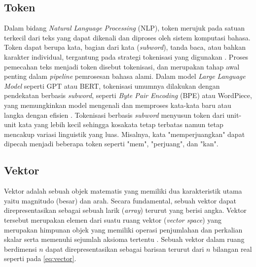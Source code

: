 \subsection{Token}
Dalam bidang \textit{Natural Language Processing} (NLP), token merujuk pada satuan terkecil dari teks yang dapat dikenali dan diproses oleh sistem komputasi bahasa.
Token dapat berupa kata, bagian dari kata (\textit{subword}), tanda baca, atau bahkan karakter individual, tergantung pada strategi tokenisasi yang digunakan \cite{Jurafsky2023SpeechLangageProcessing}.
Proses pemecahan teks menjadi token disebut tokenisasi, dan merupakan tahap awal penting dalam \textit{pipeline} pemrosesan bahasa alami.
Dalam model \textit{Large Language Model} seperti GPT atau BERT, tokenisasi umumnya dilakukan dengan pendekatan berbasis \textit{subword}, seperti \textit{Byte Pair Encoding} (BPE) atau WordPiece, yang memungkinkan model mengenali dan memproses kata-kata baru atau langka dengan efisien \cite{bostrom2020BytePairWordPieceToken}.
Tokenisasi berbasis \textit{subword} menyusun token dari unit-unit kata yang lebih kecil sehingga kosakata tetap terbatas namun tetap mencakup variasi linguistik yang luas.
Misalnya, kata "memperjuangkan" dapat dipecah menjadi beberapa token seperti "mem", "perjuang", dan "kan".


\subsection{Vektor}
Vektor adalah sebuah objek matematis yang memiliki dua karakteristik utama yaitu magnitudo (besar) dan arah.
Secara fundamental, sebuah vektor dapat direpresentasikan sebagai sebuah larik (\textit{array}) terurut yang berisi angka.
Vektor tersebut merupakan elemen dari suatu ruang vektor (\textit{vector space}) yang merupakan himpunan objek yang memiliki operasi penjumlahan dan perkalian skalar serta memenuhi sejumlah aksioma tertentu \cite{strang2009IntroductionLinearAlgebra}.
Sebuah vektor dalam ruang berdimensi $n$ dapat direpresentasikan sebagai barisan terurut dari $n$ bilangan real seperti pada \ref{eq:vector}.
\def\V{
	\begin{bmatrix}
		v_1    \\
		v_2    \\
		\vdots \\
		v_n
	\end{bmatrix}
}

